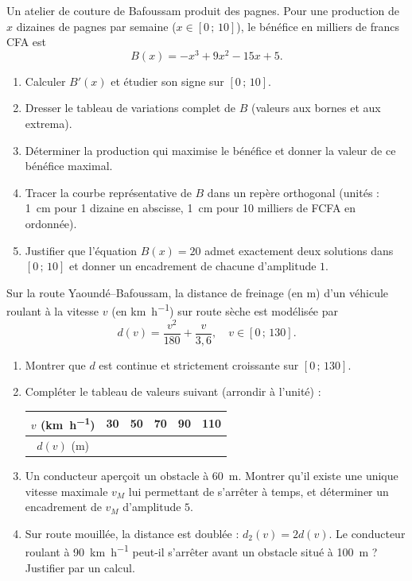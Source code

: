 \documentclass[11pt]{article}
\begin{document}
\begin{exercice}
Un atelier de couture de Bafoussam produit des pagnes. Pour une production de $x$ dizaines de pagnes par semaine ($x\in[0\,;\,10]$), le bénéfice en milliers de francs CFA est
\[ B(x)=-x^3+9x^2-15x+5. \]
\begin{enumerate}
\item Calculer $B'(x)$ et étudier son signe sur $[0\,;\,10]$.
\item Dresser le tableau de variations complet de $B$ (valeurs aux bornes et aux extrema).
\item Déterminer la production qui maximise le bénéfice et donner la valeur de ce bénéfice maximal.
\item Tracer la courbe représentative de $B$ dans un repère orthogonal (unités : \SI{1}{\centi\meter} pour 1 dizaine en abscisse, \SI{1}{\centi\meter} pour 10 milliers de FCFA en ordonnée).
\item Justifier que l'équation $B(x)=20$ admet exactement deux solutions dans $[0\,;\,10]$ et donner un encadrement de chacune d'amplitude $1$.
\end{enumerate}
\end{exercice}

\begin{exercice}
Sur la route Yaoundé--Bafoussam, la distance de freinage (en \si{\meter}) d'un véhicule roulant à la vitesse $v$ (en \si{\kilo\meter\per\hour}) sur route sèche est modélisée par
\[ d(v)=\frac{v^2}{180}+\frac{v}{3{,}6}, \quad v\in[0\,;\,130]. \]
\begin{enumerate}
\item Montrer que $d$ est continue et strictement croissante sur $[0\,;\,130]$.
\item Compléter le tableau de valeurs suivant (arrondir à l'unité) :
\begin{center}
\begin{tabular}{|c|c|c|c|c|c|}
\hline
$v$ (\si{\kilo\meter\per\hour}) & 30 & 50 & 70 & 90 & 110 \\
\hline
$d(v)$ (\si{\meter}) & & & & & \\
\hline
\end{tabular}
\end{center}
\item Un conducteur aperçoit un obstacle à \SI{60}{\meter}. Montrer qu'il existe une unique vitesse maximale $v_M$ lui permettant de s'arrêter à temps, et déterminer un encadrement de $v_M$ d'amplitude $5$.
\item Sur route mouillée, la distance est doublée : $d_2(v)=2d(v)$. Le conducteur roulant à \SI{90}{\kilo\meter\per\hour} peut-il s'arrêter avant un obstacle situé à \SI{100}{\meter} ? Justifier par un calcul.
\end{enumerate}
\end{exercice}
\end{document}
